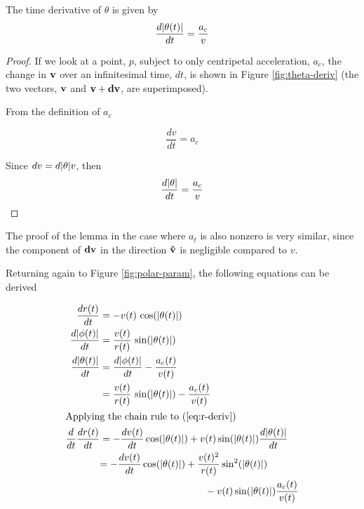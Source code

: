 \begin{lemma}
The time derivative of $\theta$ is given by
\[
\frac{d\abs{\theta(t)}}{dt} = \frac{a_c}{v}
\]
\end{lemma}

\begin{proof}

If we look at a point, $p$, subject to only centripetal acceleration, $a_c$, the change in $\mathbf{v}$ over an infinitesimal time, $dt$, is shown in Figure \ref{fig:theta-deriv} (the two vectors, $\mathbf{v}$ and $\mathbf{v}+\mathbf{dv}$, are superimposed). 


From the definition of $a_c$

\[
\frac{dv}{dt} = a_c
\]

Since $dv = d\abs{\theta} v$, then
\[
\frac{d\abs{\theta}}{dt} = \frac{a_c}{v}
\]
\end{proof}

The proof of the lemma in the case where $a_t$ is also nonzero is very similar, since the component of $\mathbf{dv}$ in the direction $\mathbf{\hat{v}}$ is negligible compared to $v$.

Returning again to Figure \ref{fig:polar-param}, the following equations can be derived

\begin{align}
  \frac{dr(t)}{dt}& = -v(t) \, \cos\paren{\abs{\theta(t)}}\label{eq:r-deriv}\\
  \frac{d\abs{\phi(t)}}{dt}& = \frac{v(t)}{r(t)} \, \sin\paren{\abs{\theta(t)}}\label{eq:phi-deriv}\\
  \frac{d\abs{\theta(t)}}{dt}& = \frac{d\abs{\phi(t)}}{dt} - \frac{a_c(t)}{v(t)}\\
  &= \frac{v(t)}{r(t)} \, \sin\paren{\abs{\theta(t)}} - \frac{a_c(t)}{v(t)}\label{eq:theta-deriv}\\
  \intertext{Applying the chain rule to (\ref{eq:r-deriv})}
  \frac{d}{dt} \frac{dr(t)}{dt}& = -\frac{dv(t)}{dt} \cos\paren{\abs{\theta(t)}} + v(t) \sin\paren{\abs{\theta(t)}} \frac{d\abs{\theta(t)}}{dt}\\
  &\begin{aligned}
    = -\frac{dv(t)}{dt} \cos\paren{\abs{\theta(t)}} &+ \frac{v(t)^2}{r(t)} \sin^2\paren{\abs{\theta(t)}}\\
    &\qquad - v(t) \sin\paren{\abs{\theta(t)}} \frac{a_c(t)}{v(t)}\label{eq:r-deriv-2}
  \end{aligned}
\end{align}

